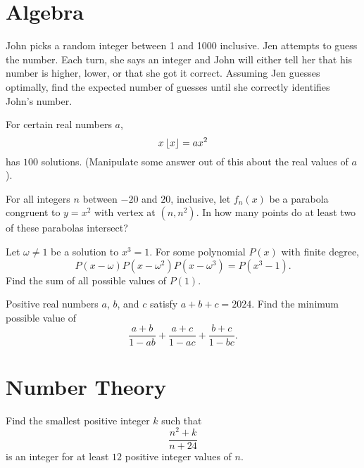 \documentclass[11pt]{scrartcl}
\begin{document}
\section{Algebra}

\begin{problem}
    John picks a random integer between 1 and 1000 inclusive. Jen attempts to guess the number. Each turn, she says an integer and John will either tell her that his number is higher, lower, or that she got it correct. Assuming Jen guesses optimally, find the expected number of guesses until she correctly identifies John's number.
\end{problem}

\begin{problem}
    For certain real numbers $a$,
    \[x\left\lfloor x \right\rfloor = ax^{2}\]
    has $100$ solutions. (Manipulate some answer out of this about the real values of $a$).
\end{problem}

\begin{problem}[1 - 2]
    For all integers $n$ between $-20$ and $20$, inclusive, let $f_{n}(x)$ be a parabola congruent to $y = x^{2}$ with vertex at $(n, n^{2})$. In how many points do at least two of these parabolas intersect?
\end{problem}

\begin{problem}
    Let $\omega \neq 1$ be a solution to $x^{3} = 1$. For some polynomial $P(x)$ with finite degree,
    \[P(x - \omega)P(x - \omega^{2})P(x - \omega^{3}) = P(x^{3} - 1).\]
    Find the sum of all possible values of $P(1)$.
\end{problem}

\begin{problem}
    Positive real numbers $a$, $b$, and $c$ satisfy $a + b + c = 2024$. Find the minimum possible value of
    \[\frac{a + b}{1 - ab} + \frac{a + c}{1 - ac} + \frac{b + c}{1 - bc}.\]
\end{problem}

\section{Number Theory}

\begin{problem}[7 - 8]
    Find the smallest positive integer $k$ such that
    \[\frac{n^{2} + k}{n + 24}\]
    is an integer for at least $12$ positive integer values of $n$.
\end{problem}
\end{document}
